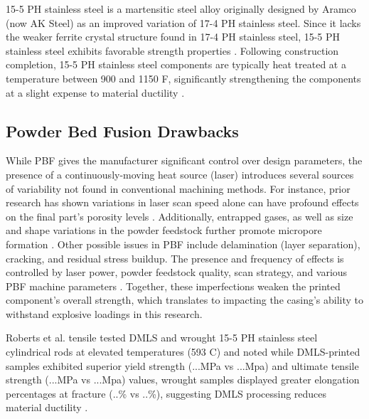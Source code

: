 15-5 \gls{PH} stainless steel is a martensitic steel alloy originally designed by Aramco (now AK Steel) as an improved variation of 17-4 \gls{PH} stainless steel. Since it lacks the weaker ferrite crystal structure found in 17-4 \gls{PH} stainless steel, 15-5 \gls{PH} stainless steel exhibits favorable strength properties  \cite{AKSteel_Conventional_SS,Ferrite_weaker}.
Following construction completion, 15-5 \gls{PH} stainless steel components are typically heat treated at a temperature between 900 and 1150 \degree F, significantly strengthening the components at a slight expense to material ductility \cite{AKSteel_Conventional_SS,EOS_StainlessSteel_M290}.  


\subsection{Powder Bed Fusion Drawbacks} \label{sec:2_PBF_drawbacks}
While \gls{PBF} gives the manufacturer significant control over design parameters, the presence of a continuously-moving heat source (laser) introduces several sources of variability not found in conventional machining methods. For instance, prior research has shown variations in laser scan speed alone can have profound effects on the final part's porosity levels \cite{ChoiSLMDensity}. Additionally, entrapped gases, as well as size and shape variations in the powder feedstock further promote micropore formation \cite{Aboulkhair2014_microscopic_pores}. Other possible issues in \gls{PBF} include delamination (layer separation), cracking, and residual stress buildup. The presence and frequency of effects is controlled by laser power, powder feedstock quality, scan strategy, and various \gls{PBF} machine parameters \cite{OverviewofAM_OHara}. Together, these imperfections weaken the printed component's overall strength, which translates to impacting the casing's ability to withstand explosive loadings in this research.

Roberts et al. tensile tested \gls{DMLS} and wrought 15-5 \gls{PH} stainless steel cylindrical rods at elevated temperatures (593 \degree C) and noted while \gls{DMLS}-printed samples exhibited superior yield strength (...MPa vs ...Mpa) and ultimate tensile strength (...MPa vs ...Mpa) values, wrought samples displayed greater elongation percentages at fracture (..\% vs ..\%), suggesting \gls{DMLS} processing reduces material ductility \cite{Roberts_Traditional_AM_15_5_testing}. 

